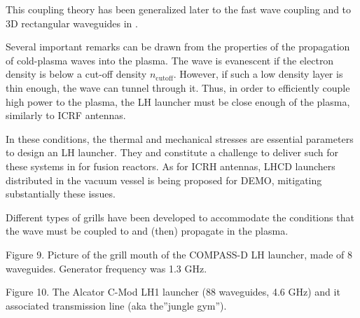 This coupling theory has been generalized later to the fast wave coupling \cite{Theilhaber1979,Theilhaber1981a} and to 3D rectangular waveguides in \cite{Bers1981, Bers1983}. 

Several important remarks can be drawn from the properties of the propagation of cold-plasma waves into the plasma. The wave is evanescent if the electron density is below a cut-off density $n_{\mathrm{cutoff}}$. However, if such a low density layer is thin enough, the wave can tunnel through it. Thus, in order to efficiently couple high power to the plasma, the LH launcher must be close enough of the plasma, similarly to ICRF antennas. 

In these conditions, the thermal and mechanical stresses are essential parameters to design an LH launcher. They and constitute a challenge to deliver such for these systems in for fusion reactors. As for ICRH antennas, LHCD launchers distributed in the vacuum vessel is being proposed for DEMO, mitigating substantially these issues.

Different types of grills have been developed to accommodate the conditions that the wave must be coupled to and (then) propagate in the plasma. 


Figure 9. Picture of the grill mouth of the COMPASS-D LH launcher, made of 8 waveguides. Generator frequency was 1.3 GHz.


Figure 10. The Alcator C-Mod LH1 launcher (88 waveguides, 4.6 GHz) and it associated transmission line (aka the”jungle gym”). 

